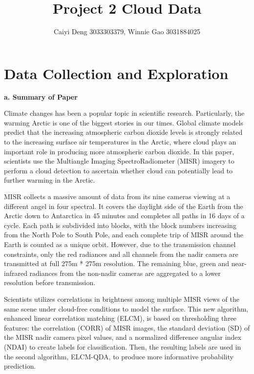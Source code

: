 \documentclass[11pt]{article}
\title{Project 2 Cloud Data}
\author {Caiyi Deng 3033303379, Winnie Gao 3031884025}
\begin{document}


\maketitle

\section{Data Collection and Exploration}

\vspace{0.2cm}
\textbf{a. Summary of Paper}

Climate changes has been a popular topic in scientific research. Particularly, the warming Arctic is one of the biggest stories in our times. Global climate models predict that the increasing atmospheric carbon dioxide levels is strongly related to the increasing surface air temperatures in the Arctic, where cloud plays an important role in producing more atmospheric carbon dioxide. In this paper, scientists use the Multiangle Imaging SpectroRadiometer (MISR) imagery to perform a cloud detection to ascertain whether cloud can potentially lead to further warming in the Arctic.

MISR collects a massive amount of data from its nine cameras viewing at a different angel in four spectral. It covers the daylight side of the Earth from the Arctic down to Antarctica in 45 minutes and completes all paths in 16 days of a cycle. Each path is subdivided into blocks, with the block numbers increasing from the North Pole to South Pole, and each complete trip of MISR around the Earth is counted as a unique orbit. However, due to the transmission channel constraints, only the red radiances and all channels from the nadir camera are transmitted at full 275m * 275m resolution. The remaining blue, green and near-infrared radiances from the non-nadir cameras are aggregated to a lower resolution before transmission. 

Scientists utilizes correlations in brightness among multiple MISR views of the same scene under cloud-free conditions to model the surface. This new algorithm, enhanced linear correlation matching (ELCM), is based on thresholding three features: the correlation (CORR) of MISR images, the standard deviation (SD) of the MISR nadir camera pixel values, and a normalized difference angular index (NDAI) to create labels for classification. Then, the resulting labels are used in the second algorithm, ELCM-QDA, to produce more informative probability prediction. 
\end{document}
